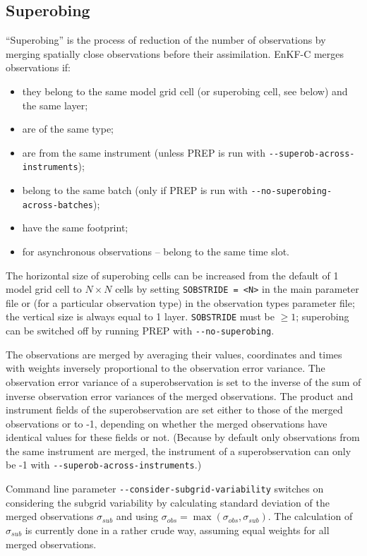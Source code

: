 \documentclass[11pt]{report}
\begin{document}
\subsection{Superobing}
\label{sec:superobing}

``Superobing'' is the process of reduction of the number of observations by merging spatially close observations before their assimilation.
EnKF-C merges observations if:
\begin{itemize}
\item they belong to the same model grid cell (or superobing cell, see below) and the same layer;
\item are of the same type;
\item are from the same instrument (unless PREP is run with \verb|--superob-across-instruments|);
\item belong to the same batch (only if PREP is run with \verb|--no-superobing-across-batches|);
\item have the same footprint;
\item for asynchronous observations -- belong to the same time slot.
\end{itemize}
The horizontal size of superobing cells can be increased from the default of 1 model grid cell to $N \times N$ cells by setting \verb|SOBSTRIDE = <N>| in the main parameter file or (for a particular observation type) in the observation types parameter file; the vertical size is always equal to 1 layer.
\verb|SOBSTRIDE| must be $\ge 1$; superobing can be switched off by running PREP with \verb|--no-superobing|.

The observations are merged by averaging their values, coordinates and times with weights inversely proportional to the observation error variance.
The observation error variance of a superobservation is set to the inverse of the sum of inverse observation error variances of the merged observations.
The product and instrument fields of the superobservation are set either to those of the merged observations or to -1, depending on whether the merged observations have identical values for these fields or not.
(Because by default only observations from the same instrument are merged, the instrument of a superobservation can only be -1 with \verb|--superob-across-instruments|.)

Command line parameter \verb|--consider-subgrid-variability| switches on considering the subgrid variability by calculating standard deviation of the merged observations $\sigma\!_{sub}$ and using $\sigma\!_{obs} = \max(\sigma\!_{obs}, \sigma\!_{sub})$.
The calculation of $\sigma\!_{sub}$ is currently done in a rather crude way, assuming equal weights for all merged observations.
\end{document}
